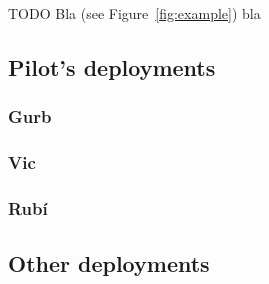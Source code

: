 TODO Bla (see Figure~\ref{fig:example}) bla


\subsection{Pilot's deployments}

\subsubsection{Gurb}



\subsubsection{Vic}

\subsubsection{Rub\'{i}}

\subsection{Other deployments}

